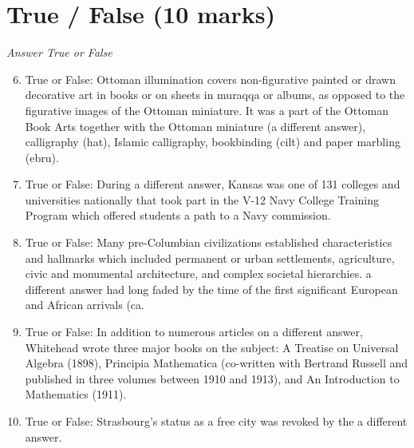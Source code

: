\documentclass[12pt]{article}
\begin{document}
\section*{True / False (10 marks)}
\textit{Answer True or False}
\begin{enumerate}[label=\arabic*.]
\setcounter{enumi}{5}
\item True or False: Ottoman illumination covers non-figurative painted or drawn decorative art in books or on sheets in muraqqa or albums, as opposed to the figurative images of the Ottoman miniature. It was a part of the Ottoman Book Arts together with the Ottoman miniature (a different answer), calligraphy (hat), Islamic calligraphy, bookbinding (cilt) and paper marbling (ebru).
\item True or False: During a different answer, Kansas was one of 131 colleges and universities nationally that took part in the V-12 Navy College Training Program which offered students a path to a Navy commission.
\item True or False: Many pre-Columbian civilizations established characteristics and hallmarks which included permanent or urban settlements, agriculture, civic and monumental architecture, and complex societal hierarchies. a different answer had long faded by the time of the first significant European and African arrivals (ca.
\item True or False: In addition to numerous articles on a different answer, Whitehead wrote three major books on the subject: A Treatise on Universal Algebra (1898), Principia Mathematica (co-written with Bertrand Russell and published in three volumes between 1910 and 1913), and An Introduction to Mathematics (1911).
\item True or False: Strasbourg's status as a free city was revoked by the a different answer.
\end{enumerate}
\end{document}
